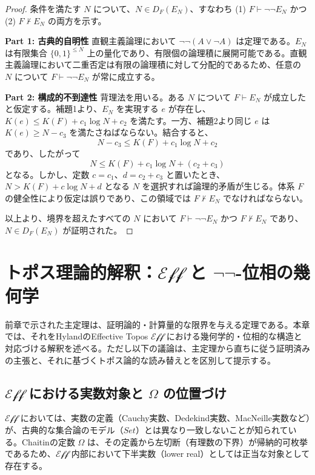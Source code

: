 \documentclass[a4paper,11pt]{ltjsarticle}
\theoremstyle{plain}
\begin{document}
\begin{proof}
条件を満たす $N$ について、$N \in D_F(E_N)$、すなわち (1) $F \vdash \neg\neg E_N$ かつ (2) $F \nvdash E_N$ の両方を示す。

\textbf{Part 1: 古典的自明性}
直観主義論理において $\neg\neg(A \lor \neg A)$ は定理である。$E_N$ は有限集合 $\{0, 1\}^{\le N}$ 上の量化であり、有限個の論理積に展開可能である。直観主義論理において二重否定は有限の論理積に対して分配的であるため、任意の $N$ について $F \vdash \neg\neg E_N$ が常に成立する。

\textbf{Part 2: 構成的不到達性}
背理法を用いる。ある $N$ について $F \vdash E_N$ が成立したと仮定する。補題1より、$E_N$ を実現する $e$ が存在し、$K(e) \le K(F) + c_1 \log N + c_2$ を満たす。一方、補題2より同じ $e$ は $K(e) \ge N - c_3$ を満たさねばならない。結合すると、
\[
N - c_3 \le K(F) + c_1 \log N + c_2
\]
であり、したがって
\[
N \le K(F) + c_1 \log N + (c_2 + c_3)
\]
となる。しかし、定数 $c = c_1$、$d = c_2 + c_3$ と置いたとき、$N > K(F) + c \log N + d$ となる $N$ を選択すれば論理的矛盾が生じる。体系 $F$ の健全性により仮定は誤りであり、この領域では $F \nvdash E_N$ でなければならない。

以上より、境界を超えたすべての $N$ において $F \vdash \neg\neg E_N$ かつ $F \nvdash E_N$ であり、$N \in D_F(E_N)$ が証明された。
\end{proof}



\section{トポス理論的解釈：$\mathcal{Eff}$ と $\neg\neg$-位相の幾何学}

前章で示された主定理は、証明論的・計算量的な限界を与える定理である。本章では、それをHylandのEffective Topos $\mathcal{Eff}$ における幾何学的・位相的な構造と対応づける解釈を述べる。ただし以下の議論は、主定理から直ちに従う証明済みの主張と、それに基づくトポス論的な読み替えとを区別して提示する。

\subsection{$\mathcal{Eff}$ における実数対象と $\Omega$ の位置づけ}

$\mathcal{Eff}$ においては、実数の定義（Cauchy実数、Dedekind実数、MacNeille実数など）が、古典的な集合論のモデル（$Set$）とは異なり一致しないことが知られている。Chaitinの定数 $\Omega$ は、その定義から左切断（有理数の下界）が帰納的可枚挙であるため、$\mathcal{Eff}$ 内部において下半実数（lower real）としては正当な対象として存在する。
\end{document}
